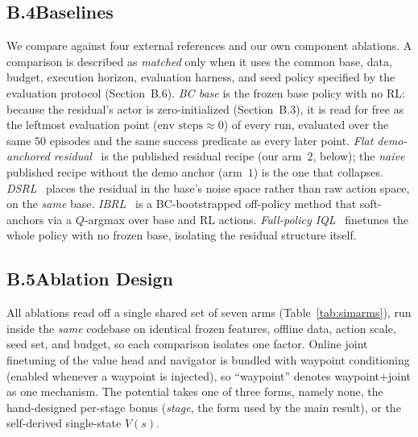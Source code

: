 \documentclass[letterpaper]{article} %
\begin{document}
\subsection{B.4\quad Baselines}

We compare against four external references and our own component ablations. A comparison
is described as \emph{matched} only when it uses the common base, data, budget, execution
horizon, evaluation harness, and seed policy specified by the evaluation protocol (Section~B.6).
\emph{BC base} is the frozen base policy with no RL: because the residual's actor is
zero-initialized (Section~B.3), it is read for free as the leftmost evaluation point
($\text{env steps}\approx 0$) of every run, evaluated over the same $50$ episodes and
the same success predicate as every later point. \emph{Flat demo-anchored
residual}~\cite{resfit2025residual} is the published residual recipe (our arm~$2$,
below); the \emph{naive} published recipe without the demo anchor (arm~$1$) is the
one that collapses. \emph{DSRL}~\cite{wagenmaker2025dsrl} places the residual in the
base's noise space rather than raw action space, on the \emph{same} base.
\emph{IBRL}~\cite{hu2023imitation} is a BC-bootstrapped off-policy method that
soft-anchors via a $Q$-argmax over base and RL actions. \emph{Full-policy
IQL}~\cite{kostrikov2022iql} finetunes the whole policy with no frozen base,
isolating the residual structure itself.

\subsection{B.5\quad Ablation Design}

All ablations read off a single shared set of seven arms
(Table~\ref{tab:simarms}), run inside the \emph{same} codebase on identical frozen
features, offline data, action scale, seed set, and budget, so each comparison
isolates one factor. Online joint finetuning of the value head and navigator is
bundled with waypoint conditioning (enabled whenever a waypoint is injected), so
``waypoint'' denotes waypoint$+$joint as one mechanism. The potential takes one of
three forms, namely none, the hand-designed per-stage bonus (\emph{stage}, the form used by
the main result), or the self-derived single-state $V(s)$.
\end{document}
